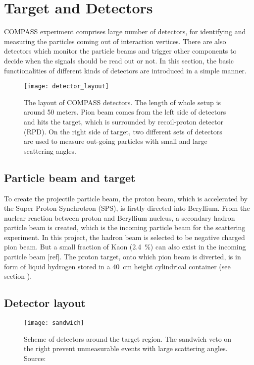\section{Target and Detectors}
COMPASS experiment comprises large number of detectors, for identifying and measuring the particles coming out of interaction vertices. There are also detectors which monitor the particle beams and trigger other components to decide when the signals should be read out or not. In this section, the basic functionalities of different kinds of detectors are introduced in a simple manner. 

\begin{figure*}[!ht]
	\centering
	\texttt{[image: detector\_layout]}
	\caption{The layout of COMPASS detectors. The length of whole setup is around 50 meters. Pion beam comes from the left side of detectors and hits the target, which is surrounded by recoil-proton detector (RPD). On the right side of target, two different sets of detectors are used to measure out-going particles with small and large scattering angles.}
	\label{fig:detec_layout}	
\end{figure*}

\subsection{Particle beam and target}
To create the projectile particle beam, the proton beam, which is accelerated by the Super Proton Synchrotron (SPS), is firstly directed into Beryllium. From the nuclear reaction between proton and Beryllium nucleus, a secondary hadron particle beam is created, which is the incoming particle beam for the scattering experiment. In this project, the hadron beam is selected to be negative charged pion beam. But a small fraction of Kaon (\SI{2.4}{\percent}) can also exist in the incoming particle beam [ref]. The proton target, onto which pion beam is diverted, is in form of liquid hydrogen stored in a \SI{40}{\centi\meter} height cylindrical container (see section ). 

\subsection{Detector layout}
\label{subsec:Detector_layout}
\begin{figure}[!th]
	\centering
	\texttt{[image: sandwich]}
	\caption{Scheme of detectors around the target region. The sandwich veto on the right prevent unmeasurable events with large scattering angles. Source: \cite{sandwich}}
	\label{fig:sandwich}
\end{figure}


